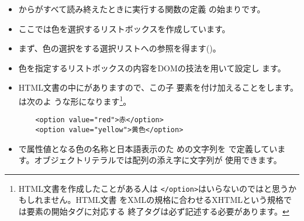 \begin{itemize}
 \item {}から\HTML がすべて読み終えたときに実行する関数の定義
       の始まりです。
  \item ここでは色を選択するリストボックスを作成しています。
 \item まず、色の選択をする選択リストへの参照を得ます()。
  \item 色を指定するリストボックスの内容をDOMの技法を用いて設定し
       ます。
 \item HTML文書の中にがありますので、この子
       要素を付け加えることをします。は次のよ
       うな形になります\footnote{HTML文書を作成したことがある人は
       \texttt{</option>}はいらないのではと思うかもしれません。HTML文書
       をXMLの規格に合わせるXHTMLという規格では要素の開始タグに対応する
       終了タグは必ず記述する必要があります。}。
\begin{Verbatim}
	<option value="red">赤</option>
	<option value="yellow">黄色</option>
\end{Verbatim}
 \item {}で属性値となる色の名称と日本語表示のた
       めの文字列を%
       で定義しています。オブジェクトリテラルでは配列の添え字に文字列が
       使用できます。
			 

\end{itemize}
